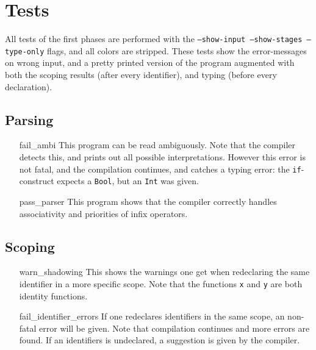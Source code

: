\documentclass[11pt]{amsart}
\begin{document}
\section{Tests}
All tests of the first phases are performed with the \texttt{--show-input --show-stages --type-only} flags, and all colors are stripped. These tests show the error-messages on wrong input, and a pretty printed version of the program augmented with both the scoping results (after every identifier), and typing (before every declaration).

\subsection{Parsing}
\begin{itemize}
	\item[fail\_ambi] This program can be read ambiguously. Note that the compiler detects this, and prints out all possible interpretations. However this error is not fatal, and the compilation continues, and catches a typing error: the \texttt{if}-construct expects a \texttt{Bool}, but an \texttt{Int} was given.
	\item[pass\_parser] This program shows that the compiler correctly handles associativity and priorities of infix operators.
\end{itemize}
\subsection{Scoping}
\begin{itemize}
	\item[warn\_shadowing] This shows the warnings one get when redeclaring the same identifier in a more specific scope. Note that the functions \texttt{x} and \texttt{y} are both identity functions.
	\item[fail\_identifier\_errors] If one redeclares identifiers in the same scope, an non-fatal error will be given. Note that compilation continues and more errors are found. If an identifiers is undeclared, a suggestion is given by the compiler.
\end{itemize}
\end{document}
